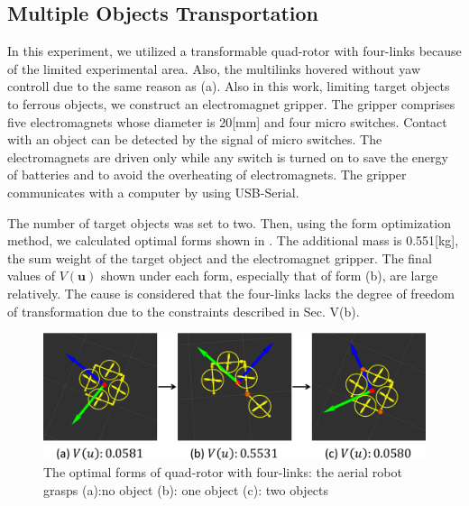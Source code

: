 \vspace{-0.5cm}
\subsection{Multiple Objects Transportation}
In this experiment, we utilized a transformable quad-rotor with four-links because of the limited experimental area. Also, the multilinks hovered without yaw controll due to the same reason as (a).  Also in this work, limiting target objects to ferrous objects, we construct an electromagnet gripper. The gripper comprises five electromagnets whose diameter is 20[mm] and four micro switches. Contact with an object can be detected by the signal of micro switches. The electromagnets are driven only while any switch is turned on to save the energy of batteries and to avoid the overheating of electromagnets. The gripper communicates with a computer by using USB-Serial.
\par
The number of target objects was set to two. Then, using the form optimization method, we calculated optimal forms shown in . The additional mass is 0.551[kg], the sum weight of the target object and the electromagnet gripper. The final values of $V(\bm{u})$ shown under each form, especially that of form (b), are large relatively. The cause is considered that the four-links lacks the degree of freedom of transformation due to the constraints described in Sec. V(b).

\begin{figure}[t]
  \begin{center}
    \includegraphics[width=1.0\columnwidth]{figs/quad_state.pdf}
  \end{center}
  \caption{The optimal forms of quad-rotor with four-links: the aerial robot grasps (a):no object (b): one object (c): two objects\label{figure:quad_state}}
\end{figure}

